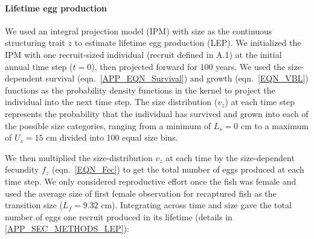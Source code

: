 \documentclass[12pt, oneside]{article}   	%
\begin{document}



\paragraph*{Lifetime egg production}

We used an integral projection model (IPM) \citep{ellner2016data} with size as the continuous structuring trait $z$ to estimate lifetime egg production (LEP). We initialized the IPM with one recruit-sized individual (recruit defined in A.1) at the initial annual time step ($t=0$), then projected forward for 100 years. We used the size-dependent survival (eqn.\ \ref{APP_EQN_Survival}) and growth (eqn.\ \ref{EQN_VBL}) functions as the probability density functions in the kernel to project the individual into the next time step. The size distribution ($v_z$) at each time step represents the probability that the individual has survived and grown into each of the possible size categories, ranging from a minimum of $L_s=0$ cm to a maximum of $U_s=15$ cm divided into 100 equal size bins. %

We then multiplied the size-distribution $v_z$ at each time by the size-dependent fecundity $f_z$ (eqn.\ \ref{EQN_Fec}) to get the total number of eggs produced at each time step. We only considered reproductive effort once the fish was female and used the average size of first female observation for recaptured fish as the transition size ($L_f = 9.32$ cm). Integrating across time and size gave the total number of eggs one recruit produced in its lifetime (details in \ref{APP_SEC_METHODS_LEP}):
\end{document}
